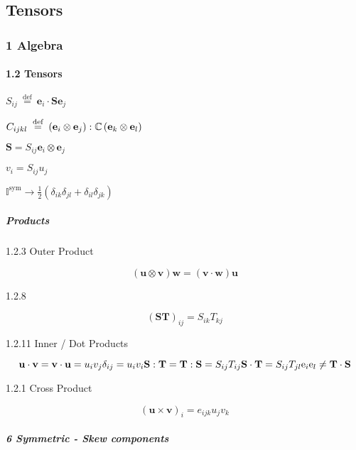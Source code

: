 \hypertarget{tensors}{%
\subsection{Tensors}\label{tensors}}

\hypertarget{algebra}{%
\subsubsection{1 Algebra}\label{algebra}}

\hypertarget{tensors-1}{%
\paragraph{1.2 Tensors}\label{tensors-1}}

\(S_{i j} \stackrel{\text { def }}{=} \mathbf{e}_{i} \cdot \mathbf{S} \mathbf{e}_{j}\)

\(C_{i j k l} \stackrel{\text { def }}{=}\left(\mathbf{e}_{i} \otimes \mathbf{e}_{j}\right): \mathbb{C}\left(\mathbf{e}_{k} \otimes \mathbf{e}_{l}\right)\\\)

\(\mathbf{S}=S_{i j} \mathbf{e}_{i} \otimes \mathbf{e}_{j}\)

\(v_i =S_{i j} u_{j}\)

\(\mathbb{I}^{\mathrm{sym}} \rightarrow \frac{1}{2}\left(\delta_{i k} \delta_{j l}+\delta_{i l} \delta_{j k}\right)\)

\hypertarget{products}{%
\subparagraph{Products}\label{products}}

1.2.3 Outer Product

\[(\mathbf{u} \otimes \mathbf{v}) \mathbf{w}=(\mathbf{v} \cdot \mathbf{w}) \mathbf{u}\]

1.2.8

\[(\mathbf{S T})_{i j}=S_{i k} T_{k j}\]

1.2.11 Inner / Dot Products

\[\mathbf{u} \cdot \mathbf{v}=\mathbf{v} \cdot \mathbf{u}=u_{i} v_{j} \delta_{ij} =u_{i} v_{i}\\\mathbf{S}: \mathbf{T}=\mathbf{T}: \mathbf{S}=S_{i j} T_{i j}\\\mathbf{S}\cdot \mathbf{T}=S_{i j} T_{j l}\mathrm{e}_{i}\mathrm{e}_{l}\neq \mathbf{T}\cdot \mathbf{S}\]

1.2.1 Cross Product

\[(\mathbf{u} \times \mathbf{v})_{i}=e_{i j k} u_{j} v_{k}\]

\hypertarget{symmetric---skew-components}{%
\subparagraph{6 Symmetric - Skew
components}\label{symmetric---skew-components}}

